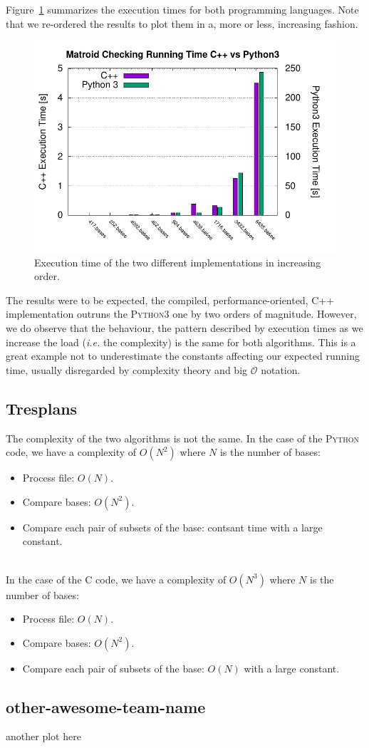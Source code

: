 \documentclass[11pt]{amsart}
\begin{document}
Figure~\ref{fig:team-bearland-times} summarizes the execution times for both programming languages.
Note that we re-ordered the results to plot them in a, more or less, increasing fashion. 
\begin{figure}[h!]
    \centering
    \includegraphics[width=.7\textwidth]{./team-berland/exec_time.pdf}
    \caption{Execution time of the two different implementations in increasing order.\label{fig:team-bearland-times}}
\end{figure}
The results were to be expected, the compiled, performance-oriented, \textsc{C++} implementation outruns the \textsc{Python3} one by two orders of magnitude.
However, we do observe that the behaviour, the pattern described by execution times as we increase the load (\textit{i.e.} the complexity) is the same for both algorithms.
This is a great example not to underestimate the constants affecting our expected running time, usually disregarded by complexity theory and big $\mathcal{O}$ notation.

\subsection{Tresplans}

The complexity of the two algorithms is not the same. In the case of the \textsc{Python} code, we have a complexity of $O(N^2)$ where $N$ is the number of bases:
\begin{itemize}
 \item Process file: $O(N)$.
 \item Compare bases: $O(N^2)$.
 \item Compare each pair of subsets of the base: contsant time with a large constant.
\end{itemize}
\\
In the case of the \textsc{C} code, we have a complexity of $O(N^3)$ where $N$ is the number of bases:

\begin{itemize}
 \item Process file: $O(N)$.
 \item Compare bases: $O(N^2)$.
 \item Compare each pair of subsets of the base: $O(N)$ with a large constant.
\end{itemize}

\subsection{other-awesome-team-name}

another plot here
\end{document}

